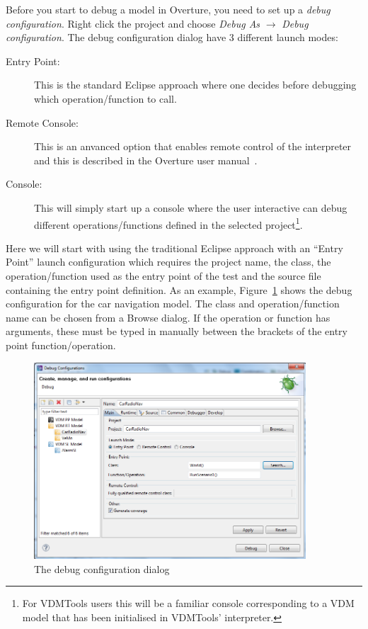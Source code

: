 Before you start to debug a model in Overture, you need to set up a
\emph{debug configuration}. Right click the project and choose
\emph{Debug As} $ \rightarrow $ \emph{Debug configuration}.
The debug configuration
dialog have 3 different launch modes:

\begin{description}
\item[Entry Point:] This is the standard Eclipse approach where one
  decides before debugging which operation/function to call.
\item[Remote Console:] This is an anvanced option that enables remote
  control of the interpreter and this is described in the Overture
  user manual~\cite{Larsen&10d}.
\item[Console:] This will simply start up a console where the user
  interactive can debug different operations/functions defined in the
  selected project\footnote{For VDMTools users this will be a familiar
    console corresponding to a VDM model that has been initialised in
    VDMTools' interpreter.}.
\end{description}

Here we will start with using 
the traditional Eclipse approach with an ``Entry Point'' launch
configuration which 
requires the project name, the class, the operation/function used as
the entry point of the test and the source file containing the entry
point definition.  As an example,
Figure~\ref{fig:userguide:debugConfiguration} shows the debug
configuration for the car navigation model. The class and
operation/function name can be chosen from a Browse dialog. If the
operation or function has arguments, these must be typed in manually
between the brackets of the entry point function/operation.

\begin{figure}[htp]
\begin{center}
  \includegraphics[width=4in]{figures/DebugConfigurationRT}
  \caption{The debug configuration dialog}
  \label{fig:userguide:debugConfiguration}
\end{center}
\end{figure}

